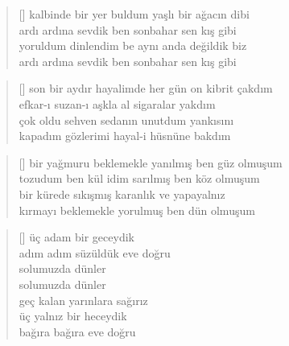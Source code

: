 \documentclass[10pt, openright, twoside]{memoir}
\theoremstyle{definition}
\begin{document}
\vspace*{\fill}
%
\newpage
{}
\vspace*{\fill}
\settowidth{\versewidth}{kalbinde bir yer buldum yaşlı bir ağacın dibi}
\begin{verse}[\versewidth]
  kalbinde bir yer buldum yaşlı bir ağacın dibi \\
  ardı ardına sevdik ben sonbahar sen kış gibi \\
  yoruldum dinlendim be aynı anda değildik biz \\
  ardı ardına sevdik ben sonbahar sen kış gibi \\
\end{verse}
\vspace*{\fill}
%
\newpage
{}
\vspace*{\fill}
\settowidth{\versewidth}{son bir aydır hayalimde her gün on kibrit çakdım}
\begin{verse}[\versewidth]
  son bir aydır hayalimde her gün on kibrit çakdım \\
  efkar-ı suzan-ı aşkla al sigaralar yakdım \\
  çok oldu sehven sedanın unutdum yankısını \\
  kapadım gözlerimi hayal-i hüsnüne bakdım \\
\end{verse}
\vspace*{\fill}
%
\newpage
{}
\vspace*{\fill}
\settowidth{\versewidth}{bir yağmuru beklemekle yanılmış ben güz olmuşum}
\begin{verse}[\versewidth]
  bir yağmuru beklemekle yanılmış ben güz olmuşum \\
  tozudum ben kül idim sarılmış ben köz olmuşum \\
  bir kürede sıkışmış karanlık ve yapayalnız \\
  kırmayı beklemekle yorulmuş ben dün olmuşum \\
\end{verse}
\vspace*{\fill}
%
\newpage
{}
\vspace*{\fill}
\settowidth{\versewidth}{adım adım süzüldük eve doğru}
\begin{verse}[\versewidth]
  üç adam bir geceydik \\
  adım adım süzüldük eve doğru \\
  solumuzda dünler \\
  solumuzda dünler \\
  geç kalan yarınlara sağırız \\
  üç yalnız bir heceydik \\
  bağıra bağıra eve doğru \\
\end{verse}
\end{document}
